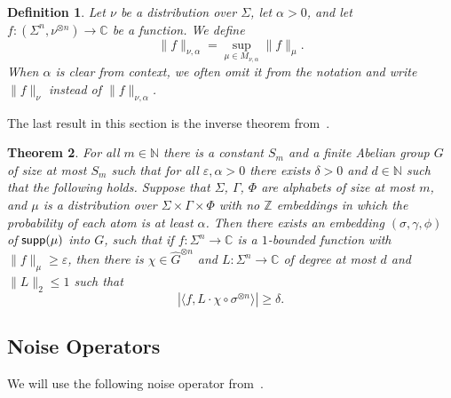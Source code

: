 \documentclass[10pt,a4paper]{amsart}
\newtheorem{thm}{Theorem}[section]
\newtheorem{definition}[thm]{Definition}
\newcommand\card[1]{\left| {#1} \right|}
\newcommand\norm[1]{\| #1 \|}
\newcommand\inner[2]{\langle{#1},{#2}\rangle}
\newcommand\eps{\varepsilon}
\renewcommand\geq{\geqslant}
\renewcommand\leq{\leqslant}
\begin{document}
    
    \begin{definition}\label{def:semi_norm_nu}
		Let $\nu$ be a distribution over $\Sigma$, let $\alpha>0$, and let $f\colon (\Sigma^n,\nu^{\otimes n})\to\mathbb{C}$ be a function. We define
		\[
		\norm{f}_{\nu,\alpha}
		=\sup_{\mu\in M_{\nu,\alpha}}\norm{f}_{\mu}.
		\]
        When $\alpha$ is clear from context, we often omit it from the notation and write $\norm{f}_{\nu}$ instead of $\norm{f}_{\nu,\alpha}$.
	\end{definition}
    The last result in this section is the inverse theorem from~\cite{BKM4}.
    \begin{thm}\label{thm:csp4}
		For all $m\in\mathbb{N}$ there is a constant $S_m$ and
        a finite Abelian group $G$ of size at most $S_m$ such that for all
		$\eps,\alpha>0$ there exists $\delta>0$ and $d\in\mathbb{N}$ such that the following holds.
		Suppose that $\Sigma$, $\Gamma$, $\Phi$ are alphabets of size at most $m$,
		and $\mu$ is a distribution over $\Sigma\times\Gamma\times \Phi$ with no $\mathbb{Z}$ embeddings
		in which the probability of each atom is at least $\alpha$.
        Then there exists an embedding $(\sigma,\gamma,\phi)$ of ${\sf supp}(\mu)$ into $G$, such that
		if $f\colon \Sigma^n\to\mathbb{C}$ is a $1$-bounded function with $\norm{f}_{\mu}\geq \eps$, then
		there is $\chi\in \hat{G}^{\otimes n}$ and $L\colon \Sigma^n\to\mathbb{C}$ of degree at most
		$d$ and $\norm{L}_2\leq 1$ such that
		\[
		\card{\inner{f}{L\cdot \chi\circ\sigma^{\otimes n}}}\geq \delta.
		\]
	\end{thm}

    \subsection{Noise Operators}
    We will use the following noise operator from~\cite{BKM5}.
    
\end{document}
